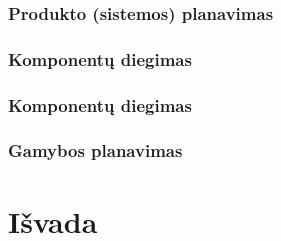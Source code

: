 \documentclass{VUMIFPSkursinis}
\begin{document}
\subsubsection{Produkto (sistemos) planavimas}
\subsubsection{Komponentų diegimas}
\subsubsection{Komponentų diegimas}
\subsubsection{Gamybos planavimas}

\section{Išvada}
\end{document}
